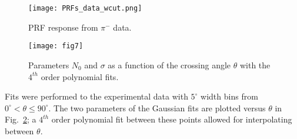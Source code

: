 \begin{figure}[!htb]
     \centering
	 \texttt{[image: PRFs\_data\_wcut.png]}
     \caption{PRF response from $\pi^-$ data. }
     \label{fig:prfpimData}
\end{figure}

\begin{figure}[ht!]
\vspace{5mm}
\texttt{[image: fig7]}
\caption{Parameters $N_{0}$ and $\sigma$ as a function of the crossing angle $\theta$ with the $4^{th}$ order polynomial fits.}
\label{fig:normsigma}
\end{figure}

\begin{comment}
\begin{table}
\centering
 \begin{tabular}{||c c c c c c||} 
 \hline
 Coefficient & $c_0$ & $c_1$ & $c_2$ & $c_3$ & $c_4$ \\ [0.5ex] 
 \hline\hline
 $0 < \theta < 45$ & & & & &  \\ [.25ex]
 \hline
 $N_0$ & .897 & 5.766E-3 & -4.263E-4 & 7.444E-6 & 5.705E-8 \\ 
 \hline
 $\sigma$ & 5.496 & -3.920E-2 & 2.693E-3 & -5.208E-5 & 5.334E-7\\
 \hline
 $45 < \theta < 90$ & & & &  & \\ [.25ex]
 \hline	
 $N_0$ & 1.220 & -6.258E-2 & 1.608E-3 & -1.492E-5  & 4.654E-8 \\
 \hline
 $\sigma$ & 31.368 & -1.109 & 1.779E-2 & -1.336E-4 & 3.940E-7\\
 \hline
\end{tabular}
\caption{Coefficients of the $4_th$ order polynomial fit to the Gaussian parameters $N_0$ and $\sigma$. The polynomial form is given as $c_0 + c_1 x + c_2 x^2 + c_3 x^3 + c_4 x^4$}
\label{tb:coeff}
\end{table}
\end{comment}
 
Fits were performed to the experimental data with  $5^{\circ}$ width bins from $0^{\circ} < \theta \leq 90^{\circ}$. The two parameters of the Gaussian fits are plotted versus $\theta$ in Fig.~\ref{fig:normsigma}; a $4^{th}$ order polynomial fit between these points allowed for interpolating between $\theta$.


